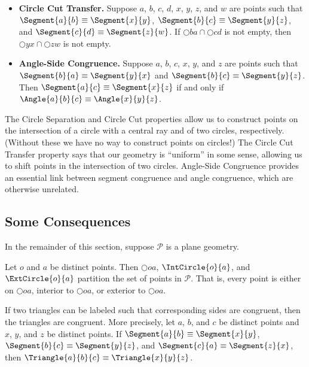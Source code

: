 \documentclass{article}
\begin{document}
\begin{dfn}
\begin{itemize}
\begin{center}
\begin{tikzpicture}[scale=0.6]
\end{tikzpicture}
\end{center}

\item \textbf{Circle Cut Transfer.} Suppose $a$, $b$, $c$, $d$, $x$, $y$, $z$, and $w$ are points such that $\Segment{a}{b} \equiv \Segment{x}{y}$, $\Segment{b}{c} \equiv \Segment{y}{z}$, and $\Segment{c}{d} \equiv \Segment{z}{w}$. If $\Circle{b}{a} \cap \Circle{c}{d}$ is not empty, then $\Circle{y}{x} \cap \Circle{z}{w}$ is not empty.

\item \textbf{Angle-Side Congruence.} Suppose $a$, $b$, $c$, $x$, $y$, and $z$ are points such that $\Segment{b}{a} \equiv \Segment{y}{x}$ and $\Segment{b}{c} \equiv \Segment{y}{z}$. Then $\Segment{a}{c} \equiv \Segment{x}{z}$ if and only if $\Angle{a}{b}{c} \equiv \Angle{x}{y}{z}$.
\end{itemize}
\end{dfn}

The Circle Separation and Circle Cut properties allow us to construct points on the intersection of a circle with a central ray and of two circles, respectively. (Without these we have no way to construct points on circles!) The Circle Cut Transfer property says that our geometry is ``uniform'' in some sense, allowing us to shift points in the intersection of two circles. Angle-Side Congruence provides an essential link between segment congruence and angle congruence, which are otherwise unrelated.

\subsection*{Some Consequences}

In the remainder of this section, suppose $\mathcal{P}$ is a plane geometry.

\begin{prop}
Let $o$ and $a$ be distinct points. Then $\Circle{o}{a}$, $\IntCircle{o}{a}$, and $\ExtCircle{o}{a}$ partition the set of points in $\mathcal{P}$. That is, every point is either on $\Circle{o}{a}$, interior to $\Circle{o}{a}$, or exterior to $\Circle{o}{a}$.
\end{prop}

\begin{prop}
If two triangles can be labeled such that corresponding sides are congruent, then the triangles are congruent. More precisely, let $a$, $b$, and $c$ be distinct points and $x$, $y$, and $z$ be distinct points. If $\Segment{a}{b} \equiv \Segment{x}{y}$, $\Segment{b}{c} \equiv \Segment{y}{z}$, and $\Segment{c}{a} \equiv \Segment{z}{x}$, then $\Triangle{a}{b}{c} \equiv \Triangle{x}{y}{z}$.
\end{prop}
\end{document}
